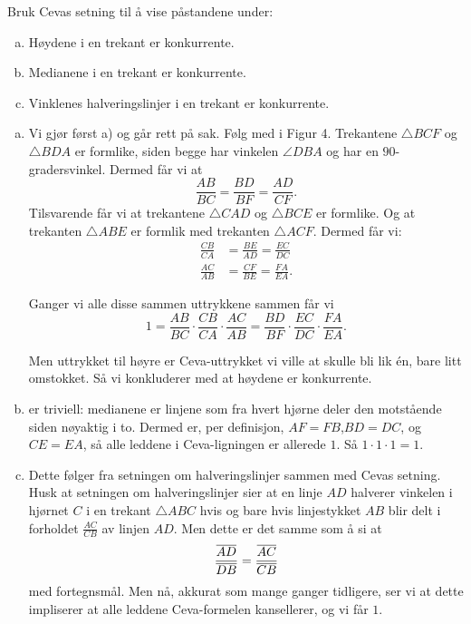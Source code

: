 \documentclass[11pt, norsk]{article}
\begin{document}
\begin{oppg}
 Bruk Cevas setning til å vise påstandene under:
 \begin{enumerate}[a)]
 \item Høydene i en trekant er konkurrente.
 \item Medianene i en trekant er konkurrente.
 \item Vinklenes halveringslinjer i en trekant er konkurrente.
 \end{enumerate}
\end{oppg}
\begin{losn}
  \begin{enumerate}[a)]
\item
Vi gjør først a) og går rett på sak. Følg med i Figur 4. Trekantene $\triangle BCF$ og $\triangle BDA$ er formlike, siden begge har vinkelen $\angle DBA$ og har en $90$-gradersvinkel. Dermed får vi at
$$
\frac{AB}{BC}=\frac{BD}{BF}=\frac{AD}{CF}.
$$
Tilsvarende får vi at trekantene $\triangle CAD$ og $\triangle BCE$ er formlike. Og at trekanten $\triangle ABE$ er formlik med trekanten $\triangle ACF$. Dermed får vi:
\begin{align*}
 \frac{CB}{CA} &= \frac{BE}{AD}= \frac{EC}{DC} \\
 \frac{AC}{AB} &= \frac{CF}{BE} = \frac{FA}{EA}.
\end{align*}

Ganger vi alle disse sammen uttrykkene sammen får vi
$$
1 = \frac{AB}{BC} \cdot \frac{CB}{CA} \cdot \frac{AC}{AB} = \frac{BD}{BF} \cdot
\frac{EC}{DC} \cdot \frac{FA}{EA}.
$$

Men uttrykket til høyre er Ceva-uttrykket vi ville at skulle bli lik én, bare litt omstokket. Så vi konkluderer med at høydene er konkurrente.

\item er triviell: medianene er linjene som fra hvert hjørne deler den motstående siden nøyaktig i to. Dermed er, per definisjon, $AF=FB$,$BD=DC$, og $CE=EA$, så alle leddene i Ceva-ligningen er allerede $1$. Så $1 \cdot 1 \cdot 1 = 1$.

\item  Dette følger fra setningen om halveringslinjer sammen med Cevas setning. Husk at setningen om halveringslinjer sier at en linje $AD$ halverer vinkelen i hjørnet $C$ i en trekant $\triangle ABC$ hvis og bare hvis linjestykket $AB$ blir delt i forholdet $\frac{AC}{CB}$ av linjen $AD$. Men dette er det samme som å si at
$$\frac{\overline{AD}}{\overline{DB}}=\frac{\overline{AC}}{\overline{CB}}$$
med fortegnsmål. Men nå, akkurat som mange ganger tidligere, ser vi at dette impliserer at alle leddene Ceva-formelen kansellerer, og vi får $1$.
\end{enumerate}


\end{losn}
\end{document}
